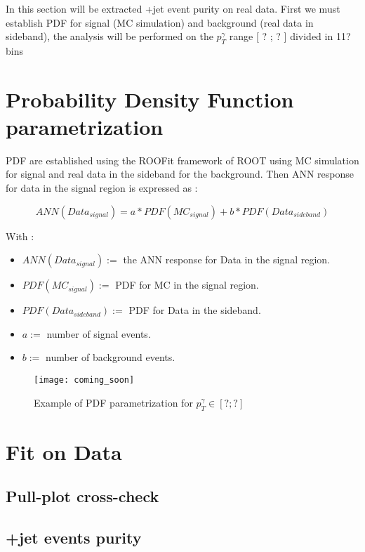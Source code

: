\label{sec:unchapitre}

In this section will be extracted \textgamma+jet event purity on real data.
First we must establish PDF for signal (MC simulation) and background (real data in sideband), the analysis will be
performed on the $p_T^\gamma$ range [ ? ; ? ] divided in 11? bins

\section{Probability Density Function parametrization}

PDF are established using the ROOFit framework of ROOT using MC simulation for signal and real data in the sideband for the background.
Then ANN response for data in the signal region is expressed as : 

\begin{equation}
ANN(Data_{signal}) = a*PDF(MC_{signal}) + b*PDF(Data_{sideband})
\end{equation}

With : 
\begin{itemize}
	\item $ANN(Data_{signal}) :=$ the ANN response for Data in the signal region.
	\item $PDF(MC_{signal}) :=$ PDF for MC in the signal region.
	\item $PDF(Data_{sideband}) :=$ PDF for Data in the sideband. 
	\item $a :=$ number of signal events.
	\item $b :=$ number of background events. 
\end{itemize}

\begin{figure}[h!]
\centering
    \texttt{[image: coming\_soon]}
    \caption{Example of PDF parametrization for $p_T^\gamma \in [ ?;? ]$}
    \label{coming_soon}
\end{figure}

\section{Fit on Data}


\subsection{Pull-plot cross-check}

\subsection{\textgamma+jet events purity}



